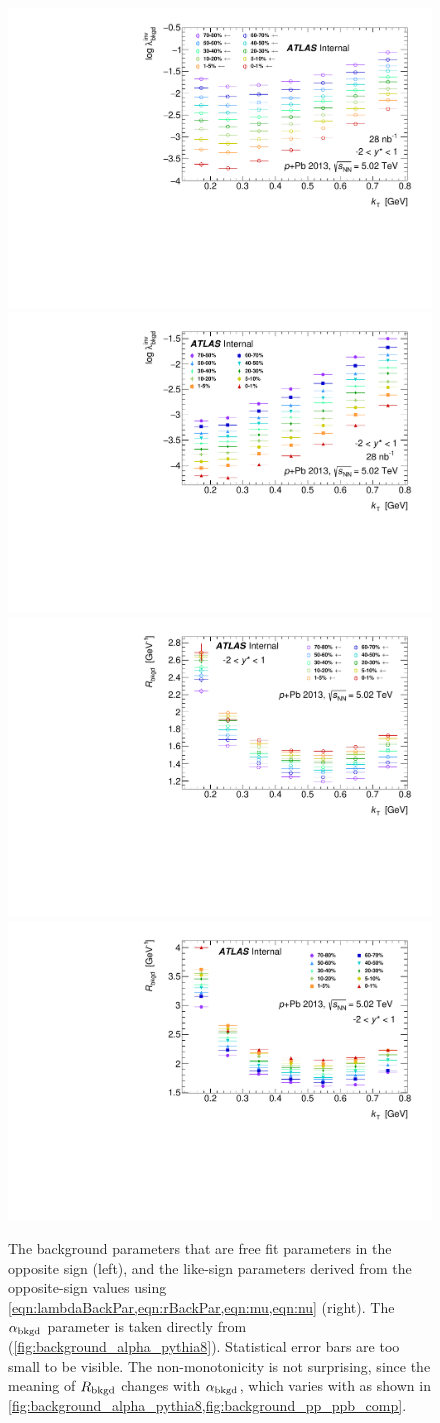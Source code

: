 \begin{figure}[t]
\begin{minipage}[t]{1.0\textwidth}
\centering
\includegraphics[width=.49\linewidth]{canqinv_backLambda_vs_kt_opp.pdf}
\includegraphics[width=.49\linewidth]{canqinv_backLambda_vs_kt_same.pdf}\\
\includegraphics[width=.49\linewidth]{canqinv_backR_vs_kt_opp.pdf}
\includegraphics[width=.49\linewidth]{canqinv_backR_vs_kt_same.pdf}\\
\end{minipage}
\caption{The background parameters that are free fit parameters in the opposite sign (left), and the like-sign parameters derived from the opposite-sign values using \cref{eqn:lambdaBackPar,eqn:rBackPar,eqn:mu,eqn:nu} (right). The $\alpha_{\mathrm{bkgd}}$ parameter is taken directly from \PYEight (\cref{fig:background_alpha_pythia8}). Statistical error bars are too small to be visible. The non-monotonicity is not surprising, since the meaning of $R_{\mathrm{bkgd}}$ changes with $\alpha_{\mathrm{bkgd}}$, which varies with \kt as shown in \cref{fig:background_alpha_pythia8,fig:background_pp_ppb_comp}.}
\label{fig:background_data}
\end{figure}


